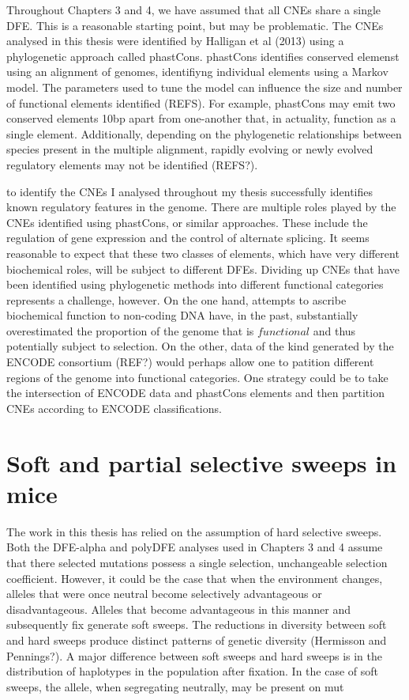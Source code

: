 Throughout Chapters 3 and 4, we have assumed that all CNEs share a single DFE. This is a reasonable starting point, but may be problematic. The CNEs analysed in this thesis were identified by Halligan et al (2013) using a phylogenetic approach called phastCons. phastCons identifies conserved elemenst using an alignment of genomes, identifiyng individual elements using a Markov model. The parameters used to tune the model can influence the size and number of functional elements identified (REFS). For example, phastCons may emit two conserved elements 10bp apart from one-another that, in actuality, function as a single element. Additionally, depending on the phylogenetic relationships between species present in the multiple alignment, rapidly evolving or newly evolved regulatory elements may not be identified (REFS?).

 to identify the CNEs I analysed throughout my thesis successfully identifies known regulatory features in the genome. There are multiple roles played by the CNEs identified using phastCons, or similar approaches. These include the regulation of gene expression and the control of alternate splicing. It seems reasonable to expect that these two classes of elements, which have very different biochemical roles, will be subject to different DFEs. Dividing up CNEs that have been identified using phylogenetic methods into different functional categories represents a challenge, however. On the one hand, attempts to ascribe biochemical function to non-coding DNA have, in the past, substantially overestimated the proportion of the genome that is $functional$ and thus potentially subject to selection. On the other, data of the kind generated by the ENCODE consortium (REF?) would perhaps allow one to patition different regions of the genome into functional categories. One strategy could be to take the intersection of ENCODE data and phastCons elements and then partition CNEs according to ENCODE classifications. 

\section{Soft and partial selective sweeps in mice}

	The work in this thesis has relied on the assumption of hard selective sweeps. Both the DFE-alpha and polyDFE analyses used in Chapters 3 and 4 assume that there selected mutations possess a single selection, unchangeable selection coefficient. However, it could be the case that when the environment changes, alleles that were once neutral become selectively advantageous or disadvantageous. Alleles that become advantageous in this manner and subsequently fix generate soft sweeps. The reductions in diversity between soft and hard sweeps produce distinct patterns of genetic diversity (Hermisson and Pennings?). 
	A major difference between soft sweeps and hard sweeps is in the distribution of haplotypes in the population after fixation. In the case of soft sweeps, the allele, when segregating neutrally, may be present on mut
	
